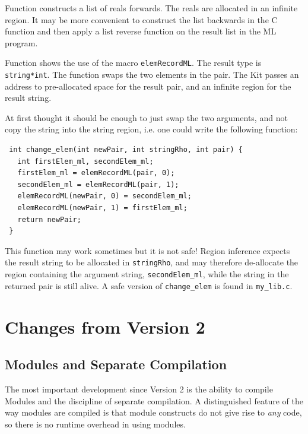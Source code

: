\documentclass[12pt]{book}
\begin{document}
\begin{example}\label{real_list.ex}
  Function  constructs a list
  of reals forwards. The reals are allocated in an infinite region. It
  may be more convenient to construct the list backwards in the C
  function and then apply a list reverse function on the result list
  in the ML program.
\end{example}

\begin{example}\label{change_elem.ex}
  Function  shows the use of
  the macro \texttt{elemRecordML}. The result type is \texttt{string*int}. The
  function swaps the two elements in the pair. The Kit passes an address to
  pre-allocated space for the result pair, and an infinite region for the
  result string.
  
  At first thought it should be enough to just swap the two arguments, and
  not copy the string into the string region, i.e. one could write the
  following function:
\begin{verbatim}
 int change_elem(int newPair, int stringRho, int pair) {
   int firstElem_ml, secondElem_ml;
   firstElem_ml = elemRecordML(pair, 0);
   secondElem_ml = elemRecordML(pair, 1);
   elemRecordML(newPair, 0) = secondElem_ml;
   elemRecordML(newPair, 1) = firstElem_ml;
   return newPair;
 }
\end{verbatim}
  This function may work sometimes but it is not safe! Region
  inference expects the result string to be allocated in
  \texttt{stringRho}, and may therefore de-allocate the region containing
  the argument string, \verb|secondElem_ml|, while the string in the
  returned pair is still alive. A safe version of \verb|change_elem| is
  found in \verb|my_lib.c|.
\end{example}

\chapter{Changes from Version 2}
\section{Modules and Separate Compilation}
The most important development since Version 2 is the
ability to compile Modules and the discipline of separate 
compilation. A distinguished feature of the way modules are
compiled is that module constructs do not give rise to 
{\em any} code, so there is no runtime overhead in using modules.
\end{document}
